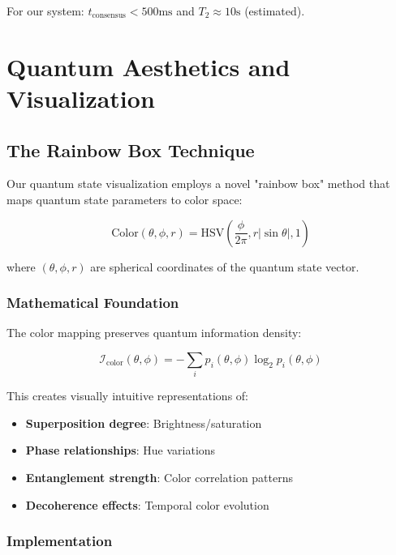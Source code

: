 \documentclass[11pt,a4paper]{article}
\begin{document}
For our system: $t_{\text{consensus}} < 500\text{ms}$ and $T_2 \approx 10\text{s}$ (estimated).

\section{Quantum Aesthetics and Visualization}

\subsection{The Rainbow Box Technique}

Our quantum state visualization employs a novel "rainbow box" method that maps quantum state parameters to color space:

\begin{equation}
\text{Color}(\theta, \phi, r) = \text{HSV}\left(\frac{\phi}{2\pi}, r|\sin\theta|, 1\right)
\end{equation}

where $(\theta, \phi, r)$ are spherical coordinates of the quantum state vector.

\subsubsection{Mathematical Foundation}

The color mapping preserves quantum information density:

\begin{equation}
\mathcal{I}_{\text{color}}(\theta, \phi) = -\sum_{i} p_i(\theta, \phi) \log_2 p_i(\theta, \phi)
\end{equation}

This creates visually intuitive representations of:
\begin{itemize}
    \item \textbf{Superposition degree}: Brightness/saturation
    \item \textbf{Phase relationships}: Hue variations
    \item \textbf{Entanglement strength}: Color correlation patterns
    \item \textbf{Decoherence effects}: Temporal color evolution
\end{itemize}

\subsubsection{Implementation}
\end{document}
